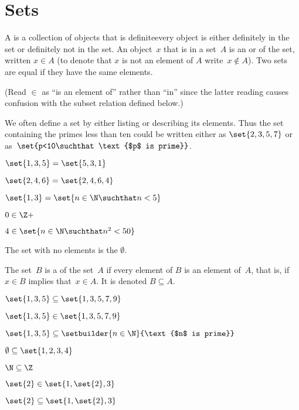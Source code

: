 \documentclass{ibl}
\begin{document}
\chapter{Sets}
\begin{df}
A  is a collection of objects that is definite\Dash every 
object is either
definitely in the set or definitely not in the set.
An object~$x$ that is in a set~$A$ is an 
or 
of the set, written $x\in A$
(to denote that $x$ is not an element of $A$ write~$x\notin A$).
Two sets are equal if they have the same elements.
\end{df}
\noindent (Read $\in$ as ``is an element of'' rather than ``in'' since the 
latter reading causes confusion with 
the subset relation defined below.)

We often define a set by either listing or describing its elements.
Thus the set containing the primes less than ten could be written
either as $\set{2, 3, 5, 7}$ or as~$\set{p<10\suchthat \text{$p$ is prime}}$.

\begin{ex} \pord
\begin{exes}
\item $\set{1,3,5}=\set{5,3,1}$    
\item $\set{2, 4, 6}=\set{2, 4, 6, 4}$    
\item $\set{1, 3}=\set{n\in\N\suchthat n<5}$ 
\item $0\in\Z+$   
\item $4\in\set{n\in\N\suchthat n^2<50}$
\end{exes}
\end{ex}

\begin{df}
The set with no elements is the  $\emptyset$.  
\end{df}

\begin{df}
The set~$B$ is a  of the set~$A$
if every element of $B$ is an element of~$A$,
that is, if $x\in B$ implies that~$x\in A$.
It is denoted $B\subseteq A$.
\end{df}

\begin{ex} \pord
\begin{exes}
\item $\set{1,3,5}\subseteq\set{1,3, 5, 7, 9}$
\item $\set{1, 3, 5}\in\set{1, 3, 5, 7, 9}$   
\item $\set{1,3,5}\subseteq\setbuilder{n\in\N}{\text{$n$ is prime}}$
\item $\emptyset\subseteq\set{1, 2, 3, 4}$
\item $\N\subseteq\Z$
\item $\set{2}\in\set{1, \set{2}, 3}$
\item $\set{2}\subseteq\set{1, \set{2}, 3}$
\end{exes}
\end{ex}
\end{document}
